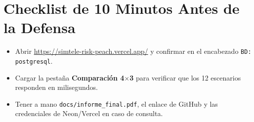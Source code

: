 \documentclass[11pt,a4paper]{article}
\begin{document}
\section{Checklist de 10 Minutos Antes de la Defensa}
\begin{itemize}[noitemsep]
    \item Abrir \url{https://simtele-risk-peach.vercel.app/} y confirmar en el encabezado \texttt{BD: postgresql}.
    \item Cargar la pestaña \textbf{Comparación 4$\times$3} para verificar que los 12 escenarios responden en milisegundos.
    \item Tener a mano \texttt{docs/informe\_final.pdf}, el enlace de GitHub y las credenciales de Neon/Vercel en caso de consulta.
\end{itemize}
\end{document}
